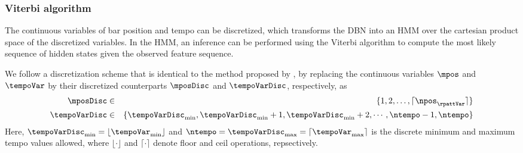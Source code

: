 \subsubsection{Viterbi algorithm}
The continuous variables of bar position and tempo can be discretized, which transforms the \gls{DBN} into an \gls{HMM} over the cartesian product space of the discretized variables. In the \gls{HMM}, an inference can be performed using the Viterbi algorithm to compute the most likely sequence of hidden states given the observed feature sequence.  
% 

We follow a discretization scheme that is identical to the method proposed by , by replacing the continuous variables $\mpos$ and $\tempoVar$ by their discretized counterparts $\mposDisc$ and $\tempoVarDisc$, respectively, as 
\begin{eqnarray}
	\mposDisc & \in & \{1,2,\ldots,\lceil \npos_\rpattVar \rceil\} \label{eqn:bpm:discmpos}\\
	\tempoVarDisc & \in & \{\tempoVarDisc_{\min}, \tempoVarDisc_{\min} + 1, \tempoVarDisc_{\min} + 2, \cdots, \ntempo - 1, \ntempo\} \label{eqn:bpm:disctempo}
\end{eqnarray}
Here, $\tempoVarDisc_{\min} = \lfloor \tempoVar_{\min} \rfloor$ and $\ntempo = \tempoVarDisc_{\max} = \lceil \tempoVar_{\max} \rceil$ is the discrete minimum and maximum tempo values allowed, where $\lfloor \cdot \rfloor$ and $\lceil \cdot \rceil$ denote floor and ceil operations, repsectively. 

